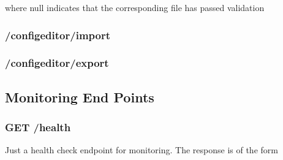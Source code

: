 \begin{Shaded}
\begin{Highlighting}[]
\FunctionTok{\{}
    \FunctionTok{:}\FunctionTok{,}
    \FunctionTok{:}\FunctionTok{,}
    \FunctionTok{:}\FunctionTok{,}
\FunctionTok{\}}
\end{Highlighting}
\end{Shaded}

where null indicates that the corresponding file has passed validation

\hypertarget{configeditorimport}{%
\subsubsection{/configeditor/import}\label{configeditorimport}}

\hypertarget{configeditorexport}{%
\subsubsection{/configeditor/export}\label{configeditorexport}}

\hypertarget{monitoring-end-points}{%
\subsection{Monitoring End Points}\label{monitoring-end-points}}

\hypertarget{get-health}{%
\subsubsection{GET /health}\label{get-health}}

Just a health check endpoint for monitoring. The response is of the form

\begin{Shaded}
\begin{Highlighting}[]
\FunctionTok{\{}
    \FunctionTok{:} \FunctionTok{,} 
    \FunctionTok{:} \FunctionTok{,} 
    \FunctionTok{:} \FunctionTok{,} 
    \FunctionTok{:} \FunctionTok{\{}
        \FunctionTok{:} \FunctionTok{\{}
            \FunctionTok{:} \FunctionTok{,} 
            \FunctionTok{:} \FunctionTok{,} 
            \FunctionTok{:} 
        \FunctionTok{\}}
    \FunctionTok{\}}
\FunctionTok{\}}
\end{Highlighting}
\end{Shaded}

